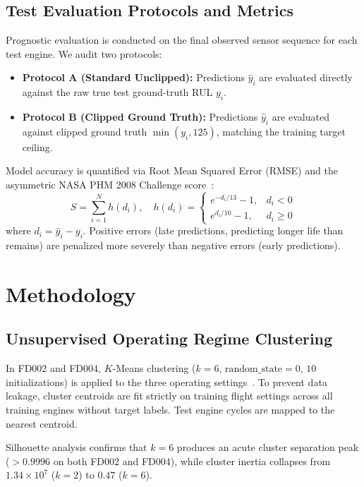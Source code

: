 \documentclass[conference]{IEEEtran}
\begin{document}
\subsection{Test Evaluation Protocols and Metrics}
Prognostic evaluation is conducted on the final observed sensor sequence for each test engine. We audit two protocols:
\begin{itemize}
    \item \textbf{Protocol A (Standard Unclipped):} Predictions $\hat{y}_i$ are evaluated directly against the raw true test ground-truth RUL $y_i$.
    \item \textbf{Protocol B (Clipped Ground Truth):} Predictions $\hat{y}_i$ are evaluated against clipped ground truth $\min(y_i, 125)$, matching the training target ceiling.
\end{itemize}

Model accuracy is quantified via Root Mean Squared Error (RMSE) and the asymmetric NASA PHM 2008 Challenge score~\cite{saxena2008cmapss}:
\begin{equation}
S = \sum_{i=1}^N h(d_i), \quad h(d_i) = \begin{cases} e^{-d_i/13} - 1, & d_i < 0 \\ e^{d_i/10} - 1, & d_i \ge 0 \end{cases}
\end{equation}
where $d_i = \hat{y}_i - y_i$. Positive errors (late predictions, predicting longer life than remains) are penalized more severely than negative errors (early predictions).

\section{Methodology}

\subsection{Unsupervised Operating Regime Clustering}
In FD002 and FD004, $K$-Means clustering ($k=6$, $\text{random\_state}=0$, $10$ initializations) is applied to the three operating settings~\cite{lloyd1982least}. To prevent data leakage, cluster centroids are fit strictly on training flight settings across all training engines without target labels. Test engine cycles are mapped to the nearest centroid. 

Silhouette analysis confirms that $k=6$ produces an acute cluster separation peak ($>0.9996$ on both FD002 and FD004), while cluster inertia collapses from $1.34 \times 10^7$ ($k=2$) to $0.47$ ($k=6$).
\end{document}
